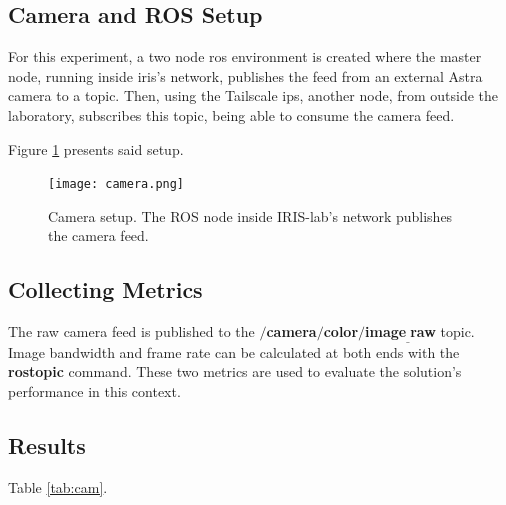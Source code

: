 \documentclass[11pt,twoside,a4paper]{report}
\begin{document}
\subsection{Camera and ROS Setup}

For this experiment, a two node \ac{ros} environment is created where the master node, running inside \ac{iris}'s network, publishes the feed from an external Astra camera to a topic. Then, using the Tailscale \acp{ip}, another node, from outside the laboratory, subscribes this topic, being able to consume the camera feed.

Figure \ref{fig:camera} presents said setup.


\begin{figure}[h]
\centering
  \texttt{[image: camera.png]}
  \caption{Camera setup. The ROS node inside IRIS-lab's network publishes the camera feed.}
  \label{fig:camera}
\end{figure}

\subsection{Collecting Metrics}

The raw camera feed is published to the \textbf{$/$camera$/$color$/$image$_\_$raw} topic. Image bandwidth and frame rate can be calculated at both ends with the \textbf{rostopic} command. These two metrics are used to evaluate the solution's performance in this context.

\subsection{Results}

Table \ref{tab:cam}.
\end{document}
